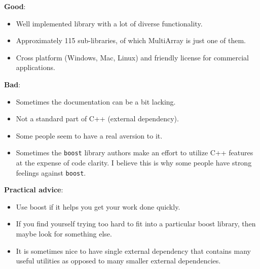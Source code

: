 \documentclass[12pt,letterpaper,twoside]{article}
\begin{document}
{\small
\textbf{Good}:\vspace{-1ex}
\begin{itemize}
\item
  Well implemented library with a lot of diverse functionality.
\item
  Approximately 115 sub-libraries, of which MultiArray is just one of
  them.
\item
  Cross platform (Windows, Mac, Linux) and friendly license for
  commercial applications.
\end{itemize}
\textbf{Bad}:\vspace{-1ex}
\begin{itemize}
\item
  Sometimes the documentation can be a bit lacking.
\item
  Not a standard part of C++ (external dependency).
\item
  Some people seem to have a real aversion to it.
\item
  Sometimes the \texttt{boost} library authors make an effort to utilize
  C++ features at the expense of code clarity. I believe this is why
  some people have strong feelings against \texttt{boost}.
\end{itemize}
\textbf{Practical advice}:\vspace{-1ex}
\begin{itemize}
\item
  Use boost if it helps you get your work done quickly.
\item
  If you find yourself trying too hard to fit into a particular boost
  library, then maybe look for something else.
\item
  It is sometimes nice to have single external dependency that contains
  many useful utilities as opposed to many smaller external
  dependencies.
\end{itemize}
}
\end{document}
